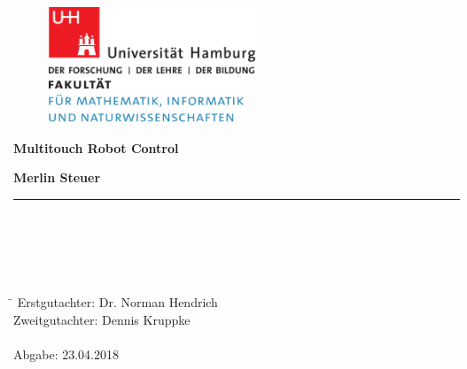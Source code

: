 \begin{titlepage}

  \setcounter{page}{-1}

	\begin{figure}[h]
		\begin{minipage}[b]{62mm}
			\includegraphics[width=62mm]{images/unilogo}
		\end{minipage}
		\hspace{4cm}
		\begin{minipage}[b]{59mm}
			\includegraphics[width=59mm]{images/minlogo}
		\end{minipage}
	\end{figure}

	\vfill
	
	\begin{center}
		\vspace{14mm}
		\noindent \textbf{\huge
		  Multitouch Robot Control \\
		}
		\vspace{60mm}	
	\end{center}
	
	\vfill
	
	\noindent \textbf{Merlin Steuer} \\
	\noindent \rule{\textwidth}{0.4mm} 
	 \\
	 \\
	 \\
	 \\
	\begin{tabbing}
	\hspace{8em} \=  \kill
	Erstgutachter: \> Dr. Norman Hendrich \\
	Zweitgutachter: \> Dennis Kruppke \\
	~ \\
	Abgabe: 23.04.2018
	\end{tabbing}
	
	\newpage 
	\thispagestyle{empty}
	\setcounter{page}{0}

	
\end{titlepage}

